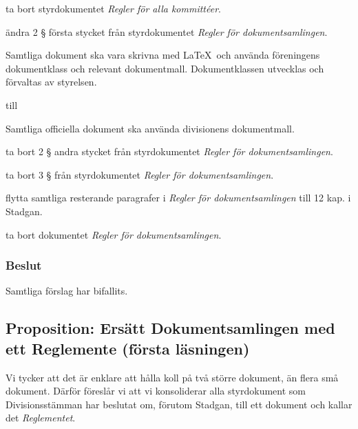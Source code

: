 \documentclass[protokoll]{dvd}
\begin{document}
\begin{attsatser}
	\item ta bort styrdokumentet \emph{Regler för alla kommittéer}.

	\item ändra 2 § första stycket från styrdokumentet \emph{Regler för dokumentsamlingen}.

	\begin{displayquote}
		Samtliga dokument ska vara skrivna med \LaTeX~och använda föreningens dokumentklass och relevant dokumentmall.
		Dokumentklassen utvecklas och förvaltas av styrelsen.
	\end{displayquote}

	till

	\begin{displayquote}
		Samtliga officiella dokument ska använda divisionens dokumentmall.
	\end{displayquote}

	\item ta bort 2 § andra stycket från styrdokumentet \emph{Regler för dokumentsamlingen}.

	\item ta bort 3 § från styrdokumentet \emph{Regler för dokumentsamlingen}.

	\item flytta samtliga resterande paragrafer i \emph{Regler för dokumentsamlingen} till 12 kap. i Stadgan.

	\item ta bort dokumentet \emph{Regler för dokumentsamlingen}.
\end{attsatser}


\subsubsection{Beslut}
\begin{attsatser}
	\item Samtliga förslag har bifallits.
\end{attsatser}


\newpage
\subsection{Proposition: Ersätt Dokumentsamlingen med ett Reglemente (första läsningen)}

Vi tycker att det är enklare att hålla koll på två större dokument, än flera små dokument.
Därför föreslår vi att vi konsoliderar alla styrdokument som Divisionsstämman har beslutat om, förutom Stadgan, till ett dokument och kallar det \emph{Reglementet}.
\end{document}
